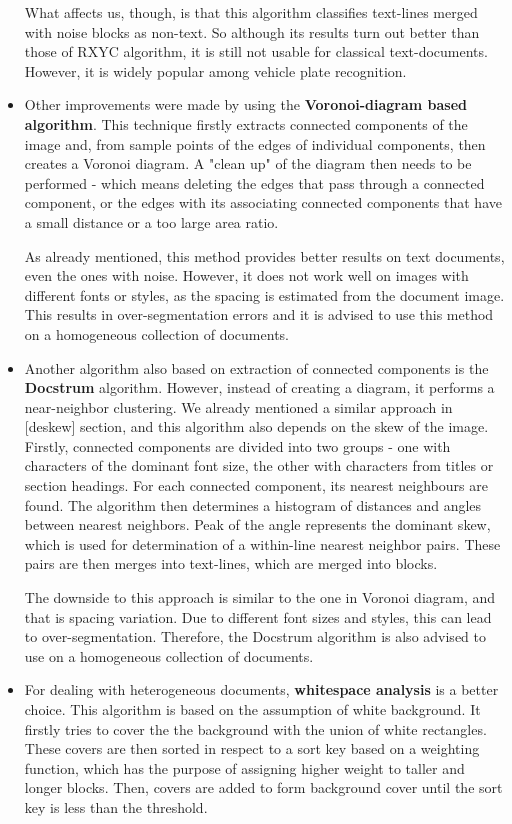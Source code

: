 \begin{itemize}
What affects us, though, is that this algorithm classifies text-lines merged with noise blocks as non-text. So although its results turn out better than those of RXYC algorithm, it is still not usable for classical text-documents. However, it is widely popular among vehicle plate recognition.

\item Other improvements were made by using the \textbf{Voronoi-diagram based algorithm}. This technique firstly extracts connected components of the image and, from sample points of the edges of individual components, then creates a Voronoi diagram. A "clean up" of the diagram then needs to be performed - which means deleting the edges that pass through a connected component, or the edges with its associating connected components that have a small distance or a too large area ratio.

As already mentioned, this method provides better results on text documents, even the ones with noise. However, it does not work well on images with different fonts or styles, as the spacing is estimated from the document image. This results in over-segmentation errors and it is advised to use this method on a homogeneous collection of documents.

\item Another algorithm also based on extraction of connected components is the \textbf{Docstrum} algorithm. However, instead of creating a diagram, it performs a near-neighbor clustering. We already mentioned a similar approach in [deskew] section, and this algorithm also depends on the skew of the image. Firstly, connected components are divided into two groups - one with characters of the dominant font size, the other with characters from titles or section headings. For each connected component, its nearest neighbours are found. The algorithm then determines a histogram of distances and angles between nearest neighbors. Peak of the angle represents the dominant skew, which is used for determination of a within-line nearest neighbor pairs. These pairs are then merges into text-lines, which are merged into blocks.

The downside to this approach is similar to the one in Voronoi diagram, and that is spacing variation. Due to different font sizes and styles, this can lead to over-segmentation. Therefore, the Docstrum algorithm is also advised to use on a homogeneous collection of documents.

\item For dealing with heterogeneous documents, \textbf{whitespace analysis} is a better choice. This algorithm is based on the assumption of white background. It firstly tries to cover the the background with the union of white rectangles. These covers are then sorted in respect to a sort key based on a weighting function, which has the purpose of assigning higher weight to taller and longer blocks. Then, covers are added to form background cover until the sort key is less than the threshold.


\end{itemize}

